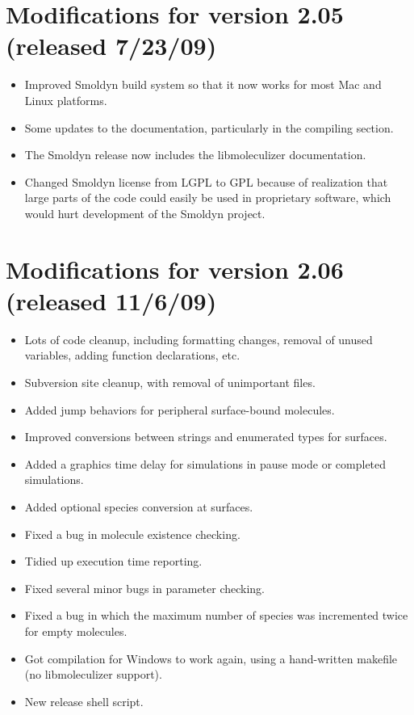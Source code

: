 \documentclass {scrbook}
\begin{document}
\section{Modifications for version 2.05 (released 7/23/09)}
\begin{itemize}
\item Improved Smoldyn build system so that it now works for most Mac and Linux platforms.
\item Some updates to the documentation, particularly in the compiling section.
\item The Smoldyn release now includes the libmoleculizer documentation.
\item Changed Smoldyn license from LGPL to GPL because of realization that large parts of the code could easily be used in proprietary software, which would hurt development of the Smoldyn project.
\end{itemize}

\section{Modifications for version 2.06 (released 11/6/09)}
\begin{itemize}
\item Lots of code cleanup, including formatting changes, removal of unused variables, adding function declarations, etc.
\item Subversion site cleanup, with removal of unimportant files.
\item Added jump behaviors for peripheral surface-bound molecules.
\item Improved conversions between strings and enumerated types for surfaces.
\item Added a graphics time delay for simulations in pause mode or completed simulations.
\item Added optional species conversion at surfaces.
\item Fixed a bug in molecule existence checking.
\item Tidied up execution time reporting.
\item Fixed several minor bugs in parameter checking.
\item Fixed a bug in which the maximum number of species was incremented twice for empty molecules.
\item Got compilation for Windows to work again, using a hand-written makefile (no libmoleculizer support).
\item New release shell script.
\end{itemize}
\end{document}
